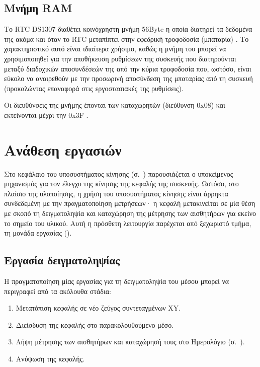 \subsection{Μνήμη RAM}
\label{subsec:rtc:user-ram}

Το RTC DS1307 διαθέτει κοινόχρηστη μνήμη 56Byte η οποία διατηρεί τα δεδομένα της
ακόμα και όταν το RTC μεταπίπτει στην εφεδρική τροφοδοσία (μπαταρία)
\parencite[1]{ds1307}. Το χαρακτηριστικό αυτό είναι ιδιαίτερα χρήσιμο, καθώς η
μνήμη του μπορεί να χρησιμοποιηθεί για την αποθήκευση ρυθμίσεων της συσκευής που
διατηρούνται μεταξύ διαδοχικών αποσυνδέσεών της από την κύρια τροφοδοσία που,
ωστόσο, είναι εύκολο να αναιρεθούν με την προσωρινή αποσύνδεση της μπαταρίας από
τη συσκευή (προκαλώντας επαναφορά στις εργοστασιακές της ρυθμίσεις).

Οι διευθύνσεις της μνήμης έπονται των καταχωρητών (διεύθυνση 0x08) και
εκτείνονται μέχρι την 0x3F \parencite[8]{ds1307}.




\section{Ανάθεση εργασιών}
\label{sec:task}

Στο κεφάλαιο του υποσυστήματος κίνησης (σ.~\pageref{ch:motor})
παρουσιάζεται ο υποκείμενος μηχανισμός για τον έλεγχο της κίνησης της κεφαλής
της συσκευής.
Ωστόσο, στο πλαίσιο της υλοποίησης, η χρήση του υποσυστήματος κίνησης είναι
άρρηκτα συνδεδεμένη με την πραγματοποίηση μετρήσεων· η κεφαλή μετακινείται σε
μία
θέση με σκοπό τη δειγματοληψία και καταχώρηση της μέτρησης των αισθητήρων για
εκείνο το σημείο του υλικού. Αυτή η πρόσθετη λειτουργία παρέχεται από ξεχωριστό
τμήμα, τη μονάδα εργασίας ().


\subsection{Εργασία δειγματοληψίας}

Η πραγματοποίηση μίας εργασίας για τη δειγματοληψία του μέσου μπορεί να
περιγραφεί από τα ακόλουθα στάδια:
\begin{enumerate}
    \item Μετατόπιση κεφαλής σε νέο ζεύγος συντεταγμένων XY.
    \item Διείσδυση της κεφαλής στο παρακολουθούμενο μέσο.
    \item Λήψη μέτρησης των αισθητήρων και καταχώρησή τους στο Ημερολόγιο
    (σ.~\pageref{sec:log}).
    \item Ανύψωση της κεφαλής.
\end{enumerate}

